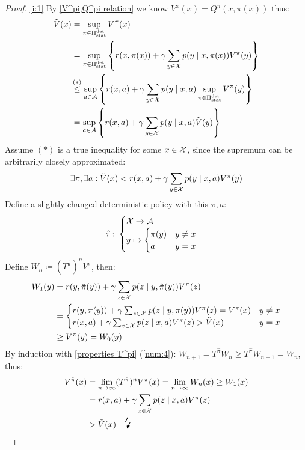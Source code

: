 \begin{proof} \ref{i:1}
By \ref{V^pi,Q^pi relation} we know \(V^\pi(x)=Q^\pi(x,\pi(x))\) thus:
\begin{align*}
	\tilde{V}(x)& =\sup_{\pi \in \detPolicy} V^\pi(x)\\
	&= \sup_{\pi\in\detPolicy} \left\{ r(x,\pi(x))+\gamma\sum\limits_{y\in\cX}p(y\mid x,\pi(x)) V^\pi(y) \right\}\\
	&\lxlq{(*)}\sup_{a\in \cA}\left\{ r(x,a)+\gamma\sum\limits_{y\in\cX}p(y\mid x,a) 
	\sup_{\pi\in\detPolicy} V^\pi(y) \right\}\\
	&=\sup_{a\in \cA}\left\{ r(x,a)+\gamma\sum\limits_{y\in\cX}p(y\mid x,a) 
	 \tilde{V}(y) \right\}
\end{align*}
Assume \((*)\) is a true inequality for some \(x\in\mathcal{X}\), since the supremum can be arbitrarily closely approximated:
\[ \exists \pi, \exists a : \tilde{V}(x) < r(x,a) + \gamma\sum_{y\in\mathcal{X}} p(y\mid x,a) V^\pi(y)\]
Define a slightly changed deterministic policy with this \(\pi,a\):
\begin{align*}
	\hat{\pi}\colon
	\begin{cases}
		\mathcal{X}\to\mathcal{A}\\
		y\mapsto
		\begin{cases}
			\pi(y) & y\neq x\\
			a & y=x
		\end{cases}
	\end{cases}
\end{align*}
Define \(W_n\coloneqq (T^{\hat{\pi}})^n V^\pi\), then:
\begin{align*}
	W_1(y)&=r(y, \hat{\pi}(y)) + \gamma \sum_{z\in\mathcal{X}} p(z \mid y, \hat{\pi}(y)) V^\pi(z)  \\
	&=\begin{cases}
			r(y, \pi(y)) + \gamma \sum_{z\in\mathcal{X}} p(z \mid y, \pi(y)) V^\pi(z) = V^\pi(x) & y\neq x  \\
			r(x, a) + \gamma \sum_{z\in\mathcal{X}} p(z \mid x, a) V^\pi(z) > \tilde{V}(x)& y=x
	\end{cases}\\
	&\ge V^\pi(y) = W_0(y)
\end{align*}
By induction with \ref{properties T^pi} (\ref{num:4}): \(W_{n+1}=T^{\hat{\pi}}W_n \ge T^{\hat{\pi}}W_{n-1}=W_n\), thus:
\begin{align*}
	V^{\hat{\pi}}(x)&=\lim_{n\to\infty}(T^{\hat{\pi}})^n V^\pi(x)=\lim_{n\to\infty} W_n(x)\ge W_1(x) \\
	&=r(x, a) + \gamma \sum_{z\in\cX} p(z \mid x, a) V^\pi(z) \\
	&> \tilde{V}(x) \contradiction
\end{align*}
\end{proof}


